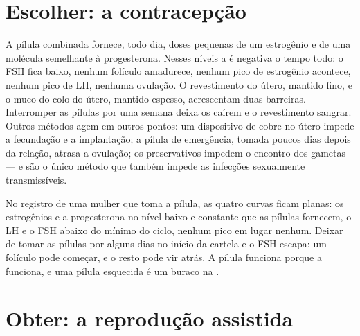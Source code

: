 \section{Escolher: a contracepção}

\begin{proposition}\label{prop:g11:hormones-and-reproduction:contraception}
A pílula combinada fornece, todo dia, doses pequenas de um estrogênio e
de uma molécula semelhante à progesterona. Nesses níveis a
 é negativa o tempo todo: o FSH fica baixo, nenhum
folículo amadurece, nenhum pico de estrogênio acontece, nenhum pico de
LH, nenhuma ovulação. O revestimento do útero, mantido fino, e o muco
do colo do útero, mantido espesso, acrescentam duas barreiras.
Interromper as pílulas por uma semana deixa os  caírem e o
revestimento sangrar. Outros métodos agem em outros pontos: um
dispositivo de cobre no útero impede a fecundação e a implantação; a
pílula de emergência, tomada poucos dias depois da relação, atrasa a
ovulação; os preservativos impedem o encontro dos gametas --- e são o
único método que também impede as infecções sexualmente transmissíveis.
\end{proposition}
\admitted

\begin{example}\label{ex:g11:hormones-and-reproduction:pill}
No registro de uma mulher que toma a pílula, as quatro curvas ficam
planas: os estrogênios e a progesterona no nível baixo e constante que
as pílulas fornecem, o LH e o FSH abaixo do mínimo do ciclo, nenhum
pico em lugar nenhum. Deixar de tomar as pílulas por alguns dias no
início da cartela e o FSH escapa: um folículo pode começar, e o resto
pode vir atrás. A pílula funciona porque a  funciona, e
uma pílula esquecida é um buraco na .
\end{example}

\section{Obter: a reprodução assistida}

